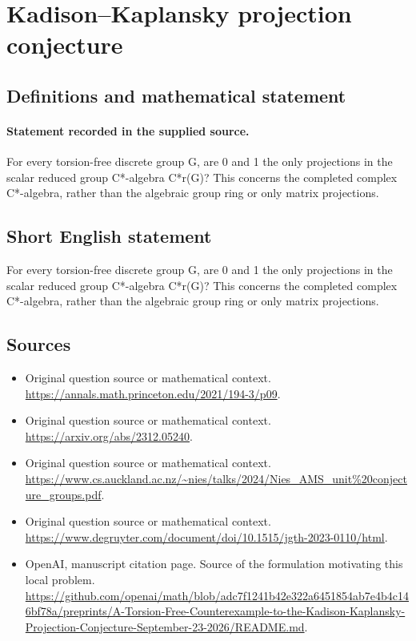 \documentclass[11pt]{article}
\begin{document}
\section*{Kadison–Kaplansky projection conjecture}\label{30007302}
\subsection{Definitions and mathematical statement}
\paragraph{Statement recorded in the supplied source.}
For every torsion-free discrete group G, are 0 and 1 the only projections in the scalar reduced group C*-algebra C*r(G)? This concerns the completed complex C*-algebra, rather than the algebraic group ring or only matrix projections.
\subsection{Short English statement}
For every torsion-free discrete group G, are 0 and 1 the only projections in the scalar reduced group C*-algebra C*r(G)? This concerns the completed complex C*-algebra, rather than the algebraic group ring or only matrix projections.
\subsection{Sources}
\begin{itemize}
\item[S1] Original question source or mathematical context.
\url{https://annals.math.princeton.edu/2021/194-3/p09}.
\item[S2] Original question source or mathematical context.
\url{https://arxiv.org/abs/2312.05240}.
\item[S3] Original question source or mathematical context.
\url{https://www.cs.auckland.ac.nz/~nies/talks/2024/Nies_AMS_unit%20conjecture_groups.pdf}.
\item[S4] Original question source or mathematical context.
\url{https://www.degruyter.com/document/doi/10.1515/jgth-2023-0110/html}.
\item[S5] OpenAI, manuscript citation page. Source of the formulation motivating this local problem.
\url{https://github.com/openai/math/blob/adc7f1241b42e322a6451854ab7e4b4c146bf78a/preprints/A-Torsion-Free-Counterexample-to-the-Kadison-Kaplansky-Projection-Conjecture-September-23-2026/README.md}.
\end{itemize}
\end{document}
